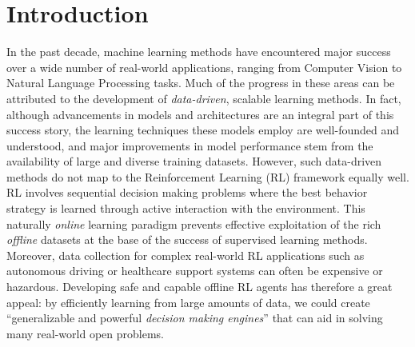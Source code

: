 \section{Introduction}\label{sec:introduction}
In the past decade, machine learning methods have encountered
major success over a wide number of real-world applications, ranging
from Computer Vision to Natural Language Processing tasks.
Much of the progress in these areas can be attributed to the
development of \textit{data-driven}, scalable learning methods. In
fact, although advancements in models and architectures are an integral
part of this success story, the learning techniques these models
employ are
well-founded and understood, and major improvements in model
performance stem from the availability of large and diverse training
datasets.
However, such data-driven methods do not map to the Reinforcement
Learning (RL) framework equally well. RL involves sequential decision
making problems where the best behavior strategy is learned through
active interaction with the environment. This naturally
\textit{online} learning paradigm prevents effective exploitation of
the rich \textit{offline} datasets at the base of the
success of supervised learning methods.
Moreover, data collection for complex real-world RL applications such as
autonomous driving or healthcare support systems can often be
expensive or hazardous. Developing safe and capable
offline RL agents has therefore a great appeal: by efficiently
learning from large amounts of data, we could create ``generalizable
and powerful \textit{decision making engines}''
\citep{levine2020offline} that can aid in solving many real-world open
problems.


